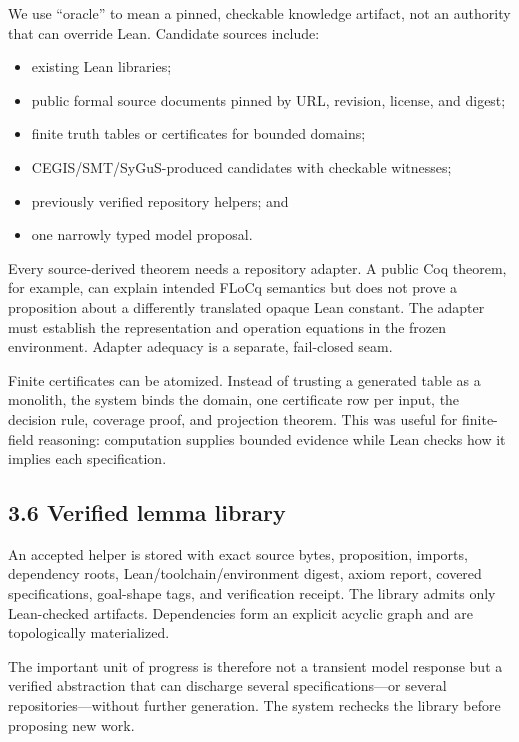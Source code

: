 \documentclass[
  10pt,
]{article}
\providecommand{\tightlist}{%
  \setlength{\itemsep}{0pt}\setlength{\parskip}{0pt}}
\begin{document}
We use ``oracle'' to mean a pinned, checkable knowledge artifact, not an
authority that can override Lean. Candidate sources include:

\begin{itemize}
\tightlist
\item
  existing Lean libraries;
\item
  public formal source documents pinned by URL, revision, license, and
  digest;
\item
  finite truth tables or certificates for bounded domains;
\item
  CEGIS/SMT/SyGuS-produced candidates with checkable witnesses;
\item
  previously verified repository helpers; and
\item
  one narrowly typed model proposal.
\end{itemize}

Every source-derived theorem needs a repository adapter. A public Coq
theorem, for example, can explain intended FLoCq semantics but does not
prove a proposition about a differently translated opaque Lean constant.
The adapter must establish the representation and operation equations in
the frozen environment. Adapter adequacy is a separate, fail-closed
seam.

Finite certificates can be atomized. Instead of trusting a generated
table as a monolith, the system binds the domain, one certificate row
per input, the decision rule, coverage proof, and projection theorem.
This was useful for finite-field reasoning: computation supplies bounded
evidence while Lean checks how it implies each specification.

\subsection{3.6 Verified lemma library}\label{verified-lemma-library}

An accepted helper is stored with exact source bytes, proposition,
imports, dependency roots, Lean/toolchain/environment digest, axiom
report, covered specifications, goal-shape tags, and verification
receipt. The library admits only Lean-checked artifacts. Dependencies
form an explicit acyclic graph and are topologically materialized.

The important unit of progress is therefore not a transient model
response but a verified abstraction that can discharge several
specifications---or several repositories---without further generation.
The system rechecks the library before proposing new work.
\end{document}
